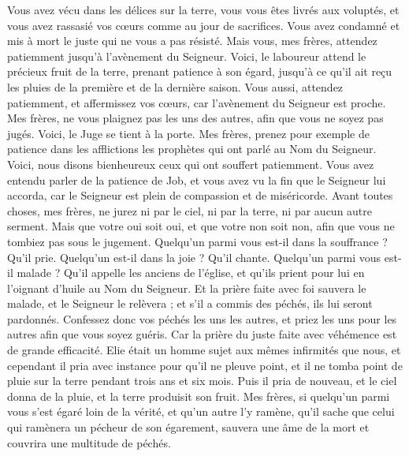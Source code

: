 \begin{multicols}{2}
Vous avez vécu dans les délices sur la terre, vous vous êtes livrés aux voluptés, et vous avez rassasié vos cœurs comme au jour de sacrifices.
Vous avez condamné et mis à mort le juste qui ne vous a pas résisté.
Mais vous, mes frères, attendez patiemment jusqu'à l'avènement du Seigneur. Voici, le laboureur attend le précieux fruit de la terre, prenant patience à son égard, jusqu'à ce qu'il ait reçu les pluies de la première et de la dernière saison.
Vous aussi, attendez patiemment, et affermissez vos cœurs, car l'avènement du Seigneur est proche.
Mes frères, ne vous plaignez pas les uns des autres, afin que vous ne soyez pas jugés. Voici, le Juge se tient à la porte.
Mes frères, prenez pour exemple de patience dans les afflictions les prophètes qui ont parlé au Nom du Seigneur.
Voici, nous disons bienheureux ceux qui ont souffert patiemment. Vous avez entendu parler de la patience de Job, et vous avez vu la fin que le Seigneur lui accorda, car le Seigneur est plein de compassion et de miséricorde.
Avant toutes choses, mes frères, ne jurez ni par le ciel, ni par la terre, ni par aucun autre serment. Mais que votre oui soit oui, et que votre non soit non, afin que vous ne tombiez pas sous le jugement.
Quelqu'un parmi vous est-il dans la souffrance ? Qu'il prie. Quelqu'un est-il dans la joie ? Qu'il chante.
Quelqu'un parmi vous est-il malade ? Qu'il appelle les anciens de l'église, et qu'ils prient pour lui en l'oignant d'huile au Nom du Seigneur.
Et la prière faite avec foi sauvera le malade, et le Seigneur le relèvera ; et s'il a commis des péchés, ils lui seront pardonnés.
Confessez donc vos péchés les uns les autres, et priez les uns pour les autres afin que vous soyez guéris. Car la prière du juste faite avec véhémence est de grande efficacité.
Elie était un homme sujet aux mêmes infirmités que nous, et cependant il pria avec instance pour qu'il ne pleuve point, et il ne tomba point de pluie sur la terre pendant trois ans et six mois.
Puis il pria de nouveau, et le ciel donna de la pluie, et la terre produisit son fruit.
Mes frères, si quelqu'un parmi vous s'est égaré loin de la vérité, et qu'un autre l'y ramène,
qu'il sache que celui qui ramènera un pécheur de son égarement, sauvera une âme de la mort et couvrira une multitude de péchés.
\PPE{}
\end{multicols}
